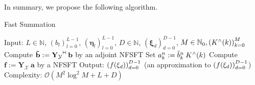 \documentclass[11pt,a4paper,twoside,bibtotoc]{scrartcl}
\theoremstyle{plain}
\theoremstyle{definition}
\theoremstyle{remark}
\newcommand{\adj}{{\vdash \hspace*{-1.72mm} \dashv}}
\newcommand{\N}{\ensuremath{\mathbb{N}}}
\newcommand{\NZ}{\ensuremath{\mathbb{N}_{0}}}
\newcommand{\fun}[2]{\ensuremath{#1{\hspace{-0.4ex}}\left(#2\right)}}
\newcommand{\paren}[1]{\ensuremath{\left(#1\right)}}
\newcommand{\mb}[1]{\mathbf{#1}}
\newcommand{\V}[1]{\mb{#1}}
\numberwithin{equation}{section}
\numberwithin{table}{section}
\numberwithin{figure}{section}
\begin{document}
In summary, we propose the following algorithm.
\begin{algorithm}[h]
  \caption{Fast Summation}
  \label{Applications:Algorithm:FastSummation}    
  \begin{algorithmic}
    \STATE  Input:  $L \in \N$, $\paren{b_{l}}_{l=0}^{L-1}$, $\paren{\V{\eta}_{l}}_{l=0}^{L-1}$, 
                    $D \in \N$, $\paren{\V{\xi}_{d}}_{d=0}^{D-1}$, $M \in \NZ, \paren{\fun{K^{\wedge}}{k}}_{k=0}^M$
    \STATE
    \STATE Compute $\V{\tilde{b}} := \V{Y_{\mathcal{Y}}}^{\adj} \: \V{b}$ by an
                    adjoint NFSFT 
        \STATE Set $a_{k}^n := \tilde{b}_{k}^n \: \fun{K^{\wedge}}{k}$
      \ENDFOR
    \ENDFOR
    \STATE Compute $\V{f} := \V{Y_{\mathcal{X}}} \: \V{a}$ by a NFSFT
    \STATE
    \STATE Output: $\paren{\fun{f}{\V{\xi}_{d}}}_{d=0}^{D-1}$ (an approximation to 
      $\paren{\fun{f}{\V{\xi}_{d}}}_{d=0}^{D-1}$)
    \STATE
    \STATE Complexity: $\mathcal{O}\left(M^2 \log^2M + L + D\right)$  
\end{algorithmic}
\end{algorithm}


\end{document}

